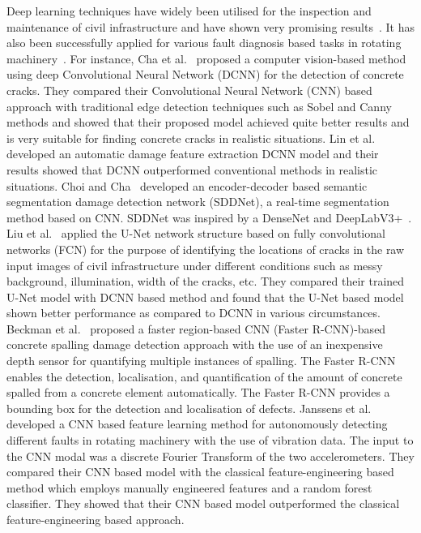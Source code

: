 \documentclass[preprint,9pt]{elsarticle}
\begin{document}
Deep learning techniques have widely been utilised for the inspection and maintenance of civil infrastructure and have shown very promising results~\cite{cha2017deep, lin2017structural, liu2019computer, beckman2019deep, choi2019sddnet}. 
It has also been successfully applied for various fault diagnosis based tasks in rotating machinery~\cite{janssens2016convolutional}. 
For instance, Cha et al.~\cite{cha2017deep} proposed a computer vision-based method using deep Convolutional Neural Network (DCNN) for the detection of concrete cracks. 
They compared their Convolutional Neural Network (CNN) based approach with traditional edge detection techniques such as Sobel and Canny methods and showed that their proposed model achieved quite better results and is very suitable for finding concrete cracks in realistic situations. 
Lin et al.~\cite{lin2017structural} developed an automatic damage feature extraction DCNN model and their results showed that DCNN outperformed conventional methods in realistic situations. 
Choi and Cha~\cite{choi2019sddnet} developed an encoder-decoder based semantic segmentation damage detection network (SDDNet), a real-time segmentation method based on CNN. 
SDDNet was inspired by a DenseNet and DeepLabV3+~\cite{chen2018encoder}. 
Liu et al.~\cite{liu2019computer} applied the U-Net network structure based on fully convolutional networks (FCN) for the purpose of identifying the locations of cracks in the raw input images of civil infrastructure under different conditions such as messy background, illumination, width of the cracks, etc. 
They compared their trained U-Net model with DCNN based method and found that the U-Net based model shown better performance as compared to DCNN in various circumstances.  
Beckman et al.~\cite{beckman2019deep} proposed a faster region-based CNN (Faster R-CNN)-based concrete spalling damage detection approach with the use of an inexpensive depth sensor for quantifying multiple instances of spalling. The Faster R-CNN enables the detection, localisation, and quantification of the amount of concrete spalled from a concrete element automatically. 
The Faster R-CNN provides a bounding box for the detection and localisation of defects. 
Janssens et al. ~\cite{janssens2016convolutional} developed a CNN based feature learning method for autonomously detecting different faults in rotating machinery with the use of vibration data. 
The input to the CNN modal was a discrete Fourier Transform of the two accelerometers. 
They compared their CNN based model with the classical feature-engineering based method which employs manually engineered features and a random forest classifier. 
They showed that their CNN based model outperformed the classical feature-engineering based approach. 
\end{document}
